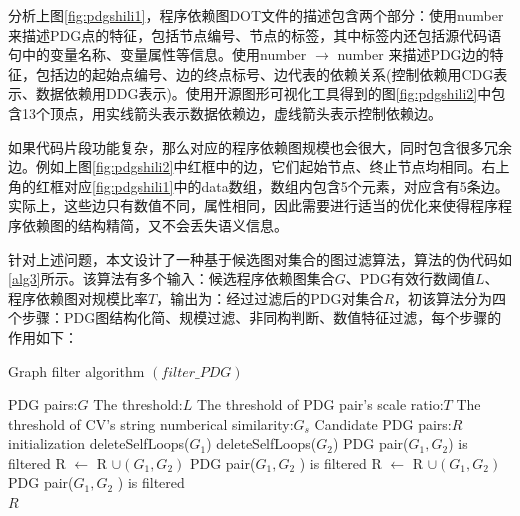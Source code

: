 
分析上图\ref{fig:pdgshili1}，程序依赖图DOT文件的描述包含两个部分：使用\textquotedbl number \textquotedbl [label =  <\(function,name\)> ]来描述PDG点的特征，包括节点编号、节点的标签，其中标签内还包括源代码语句中的变量名称、变量属性等信息。使用\textquotedbl number \textquotedbl $\to$ \textquotedbl number \textquotedbl [label = \textquotedbl CDG/DDG:data \textquotedbl ]来描述PDG边的特征，包括边的起始点编号、边的终点标号、边代表的依赖关系(控制依赖用CDG表示、数据依赖用DDG表示)。使用开源图形可视化工具得到的图\ref{fig:pdgshili2}中包含13个顶点，用实线箭头表示数据依赖边，虚线箭头表示控制依赖边。

如果代码片段功能复杂，那么对应的程序依赖图规模也会很大，同时包含很多冗余边。例如上图\ref{fig:pdgshili2}中红框中的边，它们起始节点、终止节点均相同。右上角的红框对应\ref{fig:pdgshili1}中的data数组，数组内包含5个元素，对应含有5条边。实际上，这些边只有数值不同，属性相同，因此需要进行适当的优化来使得程序程序依赖图的结构精简，又不会丢失语义信息。

针对上述问题，本文设计了一种基于候选图对集合的图过滤算法，算法的伪代码如\ref{alg3}所示。该算法有多个输入：候选程序依赖图集合$G$、PDG有效行数阈值$L$、程序依赖图对规模比率$T$，输出为：经过过滤后的PDG对集合$R$，初该算法分为四个步骤：PDG图结构化简、规模过滤、非同构判断、数值特征过滤，每个步骤的作用如下：

\begin{algorithm}[ht]  
	\renewcommand{\algorithmicrequire}{\textbf{Input:}}
	\renewcommand{\algorithmicensure}{\textbf{Output:}}
	\caption{Graph filter algorithm $\left(filter\_PDG\right)$}  
	\label{alg3}
	\begin{algorithmic}[1]
    \Require PDG pairs:$G$
    \Require The threshold:$L$
    \Require The threshold of PDG pair's scale ratio:$T$
    \Require The threshold of CV's string numberical similarity:$G_s$
		\Ensure Candidate PDG pairs:$R$
    \State initialization
      \State deleteSelfLoops($G_1$)
      \State deleteSelfLoops($G_2$) 
        \State PDG pair($G_1,G_2$) is filtered 
      \Else
           
            \State R $\leftarrow$ R $\cup \left(G_1,G_2\right)$ 
          \Else
            \State PDG pair($G_1,G_2$ ) is filtered
          \EndIf
        \Else
           
            \State R $\leftarrow$ R $\cup \left(G_1,G_2\right)$
          \Else
            \State PDG pair($G_1,G_2$ ) is filtered
          \EndIf
        \EndIf
      \EndIf 
    \EndFor \\
    \Return $R$
	\end{algorithmic}
\end{algorithm}

